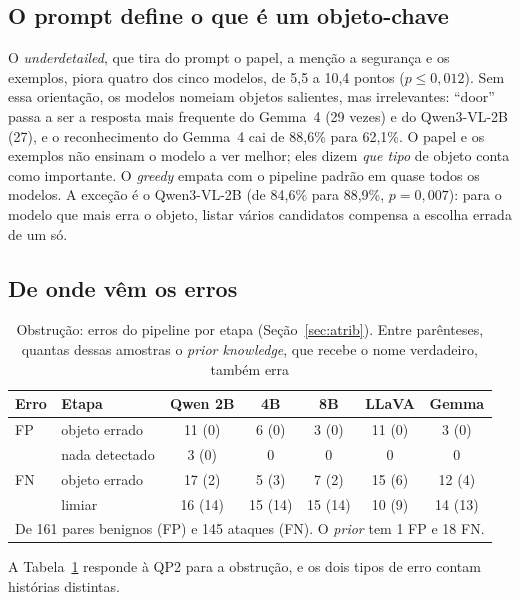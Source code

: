 \documentclass[conference]{IEEEtran}
\begin{document}
\subsection{O prompt define o que é um objeto-chave}
O \emph{underdetailed}, que tira do prompt o papel, a menção a segurança e os exemplos, piora quatro dos
cinco modelos, de 5,5 a 10,4 pontos ($p\leq 0{,}012$). Sem essa orientação, os modelos nomeiam objetos
salientes, mas irrelevantes: ``door'' passa a ser a resposta mais frequente do Gemma~4 (29 vezes) e do
Qwen3-VL-2B (27), e o reconhecimento do Gemma~4 cai de 88,6\% para 62,1\%. O papel e os exemplos não
ensinam o modelo a ver melhor; eles dizem \emph{que tipo} de objeto conta como importante. O
\emph{greedy} empata com o pipeline padrão em quase todos os modelos. A exceção é o Qwen3-VL-2B (de 84,6\%
para 88,9\%, $p=0{,}007$): para o modelo que mais erra o objeto, listar vários candidatos compensa a
escolha errada de um só.

\subsection{De onde vêm os erros}
\label{sec:res-obs-erros}

\begin{table}[!t]
\renewcommand{\arraystretch}{1.05}
\caption{Obstrução: erros do pipeline por etapa (Seção~\ref{sec:atrib}). Entre parênteses, quantas
dessas amostras o \emph{prior knowledge}, que recebe o nome verdadeiro, também erra}
\label{tab:obs-causas}
\centering
\footnotesize
\setlength{\tabcolsep}{3.2pt}
\begin{tabular}{llccccc}
\toprule
Erro & Etapa & Qwen 2B & 4B & 8B & LLaVA & Gemma \\
\midrule
FP & objeto errado & 11 (0) & 6 (0) & 3 (0) & 11 (0) & 3 (0) \\
\midrule
\multirow{3}{*}{FN} & nada detectado & 3 (0) & 0 & 0 & 0 & 0 \\
 & objeto errado & 17 (2) & 5 (3) & 7 (2) & 15 (6) & 12 (4) \\
 & limiar & 16 (14) & 15 (14) & 15 (14) & 10 (9) & 14 (13) \\
\bottomrule
\multicolumn{7}{l}{\scriptsize De 161 pares benignos (FP) e 145 ataques (FN). O \emph{prior} tem 1 FP e 18 FN.}
\end{tabular}
\end{table}

A Tabela~\ref{tab:obs-causas} responde à QP2 para a obstrução, e os dois tipos de erro contam histórias
distintas.
\end{document}
